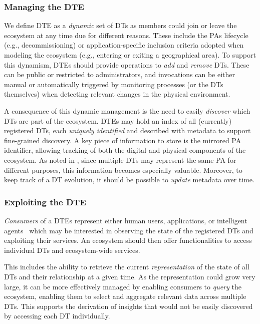 \subsubsection{Managing the \ac{DTE}}\label{sssec:operational-managing}

We define \ac{DTE} as a \emph{dynamic} set of \acp{DT} as members could join or leave the ecosystem at any time due for different reasons.
These include the \acp{PA} lifecycle (e.g., decommissioning) or application-specific inclusion criteria adopted when modeling the ecosystem (e.g., entering or exiting a geographical area).
%
To support this dynamism, \acp{DTE} should provide operations to \emph{add} and \emph{remove} \acp{DT}.
These can be public or restricted to administrators, and invocations can be either manual or automatically triggered by monitoring processes (or the \acp{DT} themselves) when detecting relevant changes in the physical environment.

A consequence of this dynamic management is the need to easily \emph{discover} which \acp{DT} are part of the ecosystem.
\acp{DTE} may hold an index of all (currently) registered \acp{DT}, each \emph{uniquely identified} and described with metadata to support fine-grained discovery.
%
A key piece of information to store is the mirrored \ac{PA} identifier, allowing tracking of both the digital and physical components of the ecosystem.
As noted in , since multiple \acp{DT} may represent the same \ac{PA} for different purposes, this information becomes especially valuable.
Moreover, to keep track of a \ac{DT} evolution, it should be possible to \emph{update} metadata over time.

\subsubsection{Exploiting the \ac{DTE}}\label{sssec:operational-exploiting}

\emph{Consumers} of a \acp{DTE} represent either human users, applications, or intelligent agents~\cite{burattini2025iot} which may be interested in observing the state of the registered \acp{DT} and exploiting their services.
%
An ecosystem should then offer functionalities to access individual \acp{DT} and ecosystem-wide services. 

This includes the ability to retrieve the current \emph{representation} of the state of all \acp{DT} and their relationship at a given time.
%
As the representation could grow very large, it can be more effectively managed by enabling consumers to \emph{query} the ecosystem, enabling them to select and aggregate relevant data across multiple \acp{DT}.
%
This supports the derivation of insights that would not be easily discovered by accessing each \ac{DT} individually.

